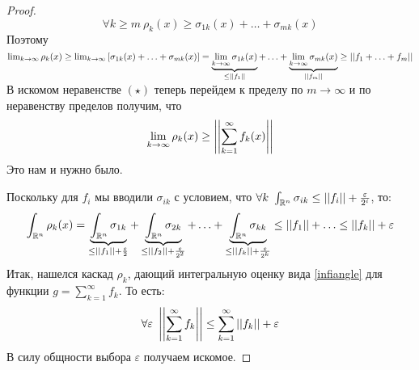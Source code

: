 \begin{statement*}
\begin{enumerate}
\begin{proof}
            \[\forall k \ge m \ \rho_k(x) \ge \sigma_{1k}(x) + \hdots +\sigma_{mk}(x)\]
            Поэтому $\lim_{k \to \infty} \rho_k(x) \ge \lim_{k \to \infty} \left[ \sigma_{1k}(x) + \hdots + \sigma_{mk}(x) \right] = \underbrace{\lim_{k \to \infty} \sigma_{1k}(x)}_{\le \left| \left| f_1 \right| \right|} + \hdots + \underbrace{\lim_{k \to \infty} \sigma_{mk}(x)}_{\left| \left| f_m \right| \right|} \ge \left| \left| f_1 + \hdots + f_m \right| \right|$ 
            В искомом неравенстве $(\star)$ теперь перейдем к пределу по $m \to \infty$ и по неравенству пределов получим, что 
            \[\lim_{k \to \infty} \rho_k(x) \ge \left| \left| \sum_{k=1}^{\infty}f_k(x) \right| \right|\]
            Это нам и нужно было. 
            \par
            Поскольку для $f_i$ мы вводили $\sigma_{ik}$ с условием, что $\forall k \ \int_{\mathbb{R}^n} \sigma_{ik} \le \left| \left| f_i \right| \right| + \frac{\varepsilon}{2^i}$, то:
            \begin{equation}
                \label{infiangle}
                \int_{\mathbb{R}^n} \rho_k(x) = \underbrace{\int_{\mathbb{R}^n} \sigma_{1k}}_{\le \left| \left| f_1 \right| \right| + \frac{\varepsilon}{2}} + \underbrace{\int_{\mathbb{R}^n} \sigma_{2k}}_{\le \left| \left| f_2 \right| \right| + \frac{\varepsilon}{2^2}} + \hdots + \underbrace{\int_{\mathbb{R}^n} \sigma_{kk}}_{\le \left| \left| f_k \right| \right|+ \frac{\varepsilon}{2^k}} \le \left| \left| f_1 \right| \right| + \hdots \le \left| \left| f_k \right| \right| + \varepsilon 
            \end{equation}
            Итак, нашелся каскад $\rho_k$, дающий интегральную оценку вида \eqref{infiangle} для функции $g = \sum_{k=1}^{\infty}f_k$.
            То есть:
            \[\forall \varepsilon \ \abs{\abs{\sum_{k=1}^{\infty} f_k}} \le \sum_{k=1}^{\infty} \abs{\abs{f_k}} +\varepsilon\]
            В силу общности выбора $\varepsilon$ получаем искомое.
        \end{proof}
    \end{enumerate}
\end{statement*}

